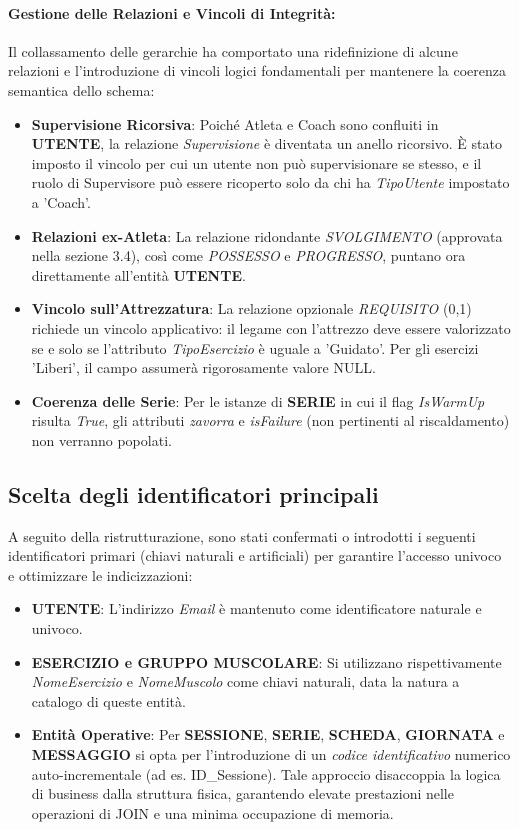 \documentclass[12pt]{report}
\begin{document}
\paragraph{Gestione delle Relazioni e Vincoli di Integrità:}
Il collassamento delle gerarchie ha comportato una ridefinizione di alcune relazioni e l'introduzione di vincoli logici fondamentali per mantenere la coerenza semantica dello schema:
\begin{itemize}
    \item \textbf{Supervisione Ricorsiva}: Poiché Atleta e Coach sono confluiti in \textbf{UTENTE}, la relazione \textit{Supervisione} è diventata un anello ricorsivo. È stato imposto il vincolo per cui un utente non può supervisionare se stesso, e il ruolo di Supervisore può essere ricoperto solo da chi ha \textit{TipoUtente} impostato a 'Coach'.
    \item \textbf{Relazioni ex-Atleta}: La relazione ridondante \textit{SVOLGIMENTO} (approvata nella sezione 3.4), così come \textit{POSSESSO} e \textit{PROGRESSO}, puntano ora direttamente all'entità \textbf{UTENTE}.
    \item \textbf{Vincolo sull'Attrezzatura}: La relazione opzionale \textit{REQUISITO} (0,1) richiede un vincolo applicativo: il legame con l'attrezzo deve essere valorizzato se e solo se l'attributo \textit{TipoEsercizio} è uguale a 'Guidato'. Per gli esercizi 'Liberi', il campo assumerà rigorosamente valore NULL.
    \item \textbf{Coerenza delle Serie}: Per le istanze di \textbf{SERIE} in cui il flag \textit{IsWarmUp} risulta \textit{True}, gli attributi \textit{zavorra} e \textit{isFailure} (non pertinenti al riscaldamento) non verranno popolati.
\end{itemize}

\subsection{Scelta degli identificatori principali}
A seguito della ristrutturazione, sono stati confermati o introdotti i seguenti identificatori primari (chiavi naturali e artificiali) per garantire l'accesso univoco e ottimizzare le indicizzazioni:
\begin{itemize}
    \item \textbf{UTENTE}: L'indirizzo \textit{Email} è mantenuto come identificatore naturale e univoco.
    \item \textbf{ESERCIZIO e GRUPPO MUSCOLARE}: Si utilizzano rispettivamente \textit{NomeEsercizio} e \textit{NomeMuscolo} come chiavi naturali, data la natura a catalogo di queste entità.
    \item \textbf{Entità Operative}: Per \textbf{SESSIONE}, \textbf{SERIE}, \textbf{SCHEDA}, \textbf{GIORNATA} e \textbf{MESSAGGIO} si opta per l'introduzione di un \textit{codice identificativo} numerico auto-incrementale (ad es. ID\_Sessione). Tale approccio disaccoppia la logica di business dalla struttura fisica, garantendo elevate prestazioni nelle operazioni di JOIN e una minima occupazione di memoria.
\end{itemize}
\end{document}
